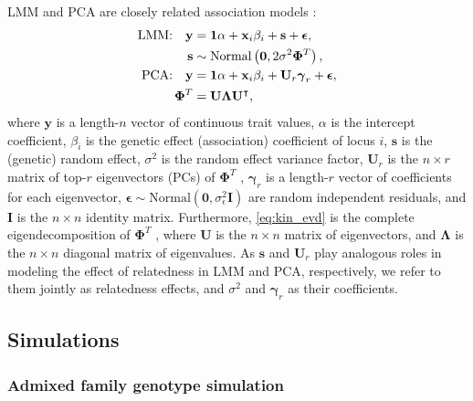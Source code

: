 \documentclass[11pt]{article}
\newcommand{\kinMat}[1][T]{%
  \ensuremath{%
    \mathbf{\Phi}^{#1}
  }%
  \xspace%
}%
\begin{document}
LMM and PCA are closely related association models \citep{astle_population_2009, hoffman_correcting_2013, yao_limitations_2022}:
\begin{align}
  \label{eq:lmm_gwas}
  \text{LMM:}\quad
  \mathbf{y}
  &=
    \mathbf{1} \alpha + \mathbf{x}_i \beta_i + \mathbf{s} + \boldsymbol{\epsilon}
    , \\
  \label{eq:lmm_rand_eff}
  \mathbf{s}
  &\sim
    \text{Normal} \left( \mathbf{0}, 2 \sigma^2 \kinMat \right), \\
  \label{eq:pca_gwas}
  \text{PCA:}\quad
  \mathbf{y}
  &=
    \mathbf{1} \alpha + \mathbf{x}_i \beta_i + \mathbf{U}_r \boldsymbol{\gamma}_r + \boldsymbol{\epsilon}
    , \\
  \label{eq:kin_evd}
  \kinMat
  &=
    \mathbf{U} \mathbf{\Lambda} \mathbf{U}^\intercal
    ,
\end{align}
where
$\mathbf{y}$ is a length-$n$ vector of continuous trait values,
$\alpha$ is the intercept coefficient,
$\beta_i$ is the genetic effect (association) coefficient of locus $i$,
$\mathbf{s}$ is the (genetic) random effect,
$\sigma^2$ is the random effect variance factor,
$\mathbf{U}_r$ is the $n \times r$ matrix of top-$r$ eigenvectors (PCs) of \kinMat,
$\boldsymbol{\gamma}_r$ is a length-$r$ vector of coefficients for each eigenvector,
$\boldsymbol{\epsilon} \sim \text{Normal}(\mathbf{0}, \sigma^2_\epsilon \mathbf{I})$ are random independent residuals,
and $\mathbf{I}$ is the $n \times n$ identity matrix.
Furthermore, \cref{eq:kin_evd} is the complete eigendecomposition of \kinMat,
where $\mathbf{U}$ is the $n \times n$ matrix of eigenvectors, and
$\mathbf{\Lambda}$ is the $n \times n$ diagonal matrix of eigenvalues.
As $\mathbf{s}$ and $\mathbf{U}_r$ play analogous roles in modeling the effect of relatedness in LMM and PCA, respectively, we refer to them jointly as relatedness effects, and $\sigma^2$ and $\boldsymbol{\gamma}_r$ as their coefficients.

\subsection{Simulations}

\subsubsection{Admixed family genotype simulation}
\end{document}
